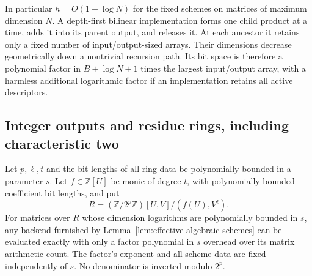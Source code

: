 In particular $h=O(1+\log N)$ for the fixed schemes on matrices of maximum
dimension $N$. A depth-first bilinear implementation forms one child
product at a time, adds it into its parent output, and releases it.
At each ancestor it retains only a fixed number of input/output-sized
arrays. Their dimensions decrease geometrically down a nontrivial
recursion path. Its bit space is therefore a polynomial factor in
$B+\log N+1$ times the largest input/output array, with a harmless
additional logarithmic factor if an implementation retains all active
descriptors.

\subsection{Integer outputs and residue rings, including characteristic two}

\begin{proposition}
\label{prop:residue-ring-bridge}
Let $p,\ell,t$ and the bit lengths of all ring data be polynomially
bounded in a parameter $s$. Let $f\in\mathbb Z[U]$ be monic of degree
$t$, with polynomially bounded coefficient bit lengths, and put
\[
 R=(\mathbb Z/2^p\mathbb Z)[U,V]/(f(U),V^\ell).
\]
For matrices over $R$ whose dimension logarithms are polynomially bounded
in $s$, any backend furnished by Lemma~\ref{lem:effective-algebraic-schemes}
can be evaluated exactly with only a factor polynomial in $s$ overhead
over its matrix arithmetic count. The factor's exponent and all scheme
data are fixed independently of $s$. No denominator is inverted modulo
$2^p$.
\end{proposition}


